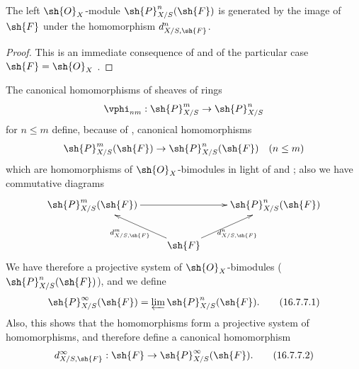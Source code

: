 \begin{proposition}[16.7.6]
\label{IV.16.7.6}
The left $\sh{O}_X$-module $\sh{P}_{X/S}^n(\sh{F})$ is generated by the image of $\sh{F}$ under the homomorphism $d_{X/S, \sh{F}}^n$.
\end{proposition}

\begin{proof}
This is an immediate consequence of  and of the particular case $\sh{F} = \sh{O}_X$ .
\end{proof}

\begin{env}[16.7.7]
\label{IV.16.7.7}
The canonical homomorphisms of sheaves of rings
\[
  \vphi_{nm}:\sh{P}_{X/S}^m \to \sh{P}_{X/S}^n 
\]
for $n \leq m$  define, because of , canonical homomorphisms 
\[
  \sh{P}_{X/S}^m(\sh{F}) \to \sh{P}_{X/S}^n(\sh{F}) \quad (n \leq m)
\]
which are homomorphisms of $\sh{O}_X$-bimodules in light of  and ;
also we have commutative diagrams
\[
  \xymatrix{
    \sh{P}_{X/S}^m(\sh{F}) \ar[rr] && \sh{P}_{X/S}^n(\sh{F}) \\
      & \sh{F} \ar[ul]^-{d_{X/S,\sh{F}}^m} \ar[ur]_-{d_{X/S,\sh{F}}^n}
  }
\]
We have therefore a projective system of $\sh{O}_X$-bimodules ($\sh{P}_{X/S}^n(\sh{F})$), and we define
\[
  \label{IV.16.7.7.1}
  \sh{P}_{X/S}^\infty(\sh{F}) = \varprojlim \sh{P}_{X/S}^n(\sh{F}).
  \tag{16.7.7.1}
\]
Also, this shows that the homomorphisms  form a projective system of homomorphisms, and therefore define a canonical homomorphism
\[
  \label{IV.16.7.7.2}
  d_{X/S,\sh{F}}^\infty: \sh{F} \to \sh{P}_{X/S}^\infty(\sh{F}).
  \tag{16.7.7.2}
\]
\end{env}


